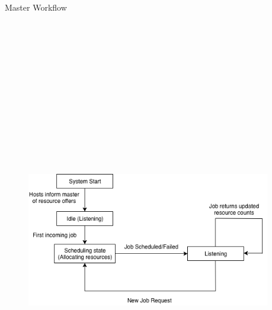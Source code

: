 \documentclass[unknownkeysallowed, final]{beamer}
\begin{document}
\begin{frame}
\begin{columns}[t]
\begin{column}{.33\linewidth}
\end{column}
\begin{column}{.34\linewidth}

	\begin{block}{Master Workflow}
		\begin{figure}
		    \centering
		    \includegraphics[height=19.5cm,width=39cm]{master.png}

\end{figure}
\end{block}
\end{column}
\end{columns}
\end{frame}
\end{document}
